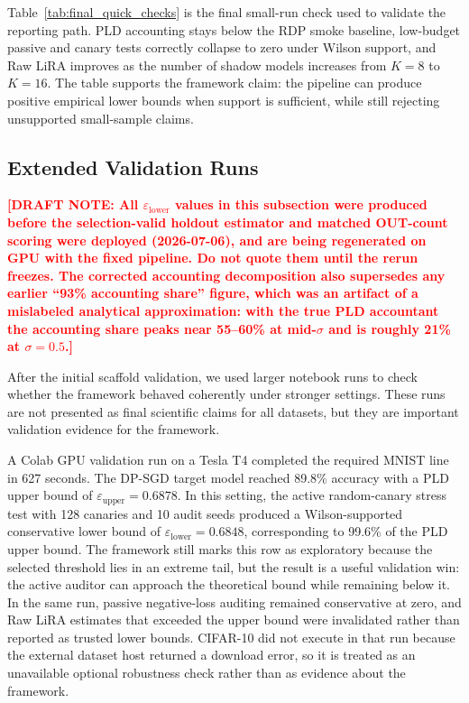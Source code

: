 \documentclass{article}
\newcommand{\draftnote}[1]{\textcolor{red}{\textbf{[DRAFT NOTE: #1]}}}
\begin{document}
Table~\ref{tab:final_quick_checks} is the final small-run check used to validate the reporting path. PLD accounting stays below the RDP smoke baseline, low-budget passive and canary tests correctly collapse to zero under Wilson support, and Raw LiRA improves as the number of shadow models increases from $K=8$ to $K=16$. The table supports the framework claim: the pipeline can produce positive empirical lower bounds when support is sufficient, while still rejecting unsupported small-sample claims.

\subsection{Extended Validation Runs}

\draftnote{All $\varepsilon_{\text{lower}}$ values in this subsection were produced before the selection-valid holdout estimator and matched OUT-count scoring were deployed (2026-07-06), and are being regenerated on GPU with the fixed pipeline. Do not quote them until the rerun freezes. The corrected accounting decomposition also supersedes any earlier ``93\% accounting share'' figure, which was an artifact of a mislabeled analytical approximation: with the true PLD accountant the accounting share peaks near 55--60\% at mid-$\sigma$ and is roughly 21\% at $\sigma=0.5$.}

After the initial scaffold validation, we used larger notebook runs to check whether the framework behaved coherently under stronger settings. These runs are not presented as final scientific claims for all datasets, but they are important validation evidence for the framework.

A Colab GPU validation run on a Tesla T4 completed the required MNIST line in 627 seconds. The DP-SGD target model reached 89.8\% accuracy with a PLD upper bound of $\varepsilon_{\text{upper}}=0.6878$. In this setting, the active random-canary stress test with 128 canaries and 10 audit seeds produced a Wilson-supported conservative lower bound of $\varepsilon_{\text{lower}}=0.6848$, corresponding to 99.6\% of the PLD upper bound. The framework still marks this row as exploratory because the selected threshold lies in an extreme tail, but the result is a useful validation win: the active auditor can approach the theoretical bound while remaining below it. In the same run, passive negative-loss auditing remained conservative at zero, and Raw LiRA estimates that exceeded the upper bound were invalidated rather than reported as trusted lower bounds. CIFAR-10 did not execute in that run because the external dataset host returned a download error, so it is treated as an unavailable optional robustness check rather than as evidence about the framework.
\end{document}
